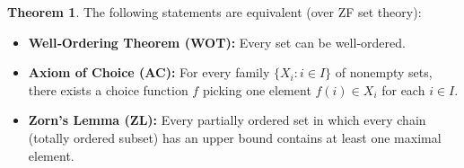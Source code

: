\documentclass[12pt]{article}
\theoremstyle{definition} %
\newtheorem{theorem}{Theorem}
\theoremstyle{plain} %
\begin{document}
                            \begin{theorem}
                                \label{thm:equivalences}
                                The following statements are equivalent (over ZF set theory):
                                \begin{itemize}
                                  \item[\textnormal{(1)}] \textbf{Well‐Ordering Theorem (WOT):} Every set can be well‐ordered.
                                  \item[\textnormal{(2)}] \textbf{Axiom of Choice (AC):} For every family $\{X_i : i \in I\}$ of nonempty sets,
                                  there exists a choice function $f$ picking one element $f(i) \in X_i$ for each $i \in I$.
                                  \item[\textnormal{(3)}] \textbf{Zorn’s Lemma (ZL):} Every partially ordered set in which every chain
                                  (totally ordered subset) has an upper bound contains at least one maximal element.
                                \end{itemize}
                                \end{theorem}
                                
\end{document}
